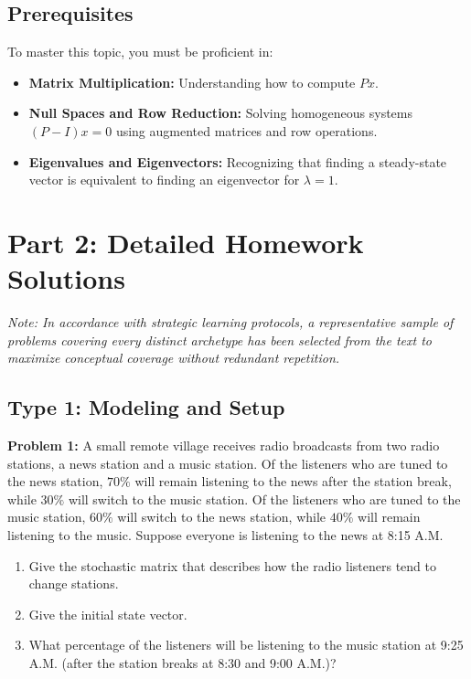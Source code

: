 \documentclass[11pt, letterpaper]{article}
\theoremstyle{definition}
\theoremstyle{remark}
\begin{document}
\subsection{Prerequisites}
To master this topic, you must be proficient in:
\begin{itemize}
    \item \textbf{Matrix Multiplication:} Understanding how to compute $Px$.
    \item \textbf{Null Spaces and Row Reduction:} Solving homogeneous systems $(P - I)x = 0$ using augmented matrices and row operations.
    \item \textbf{Eigenvalues and Eigenvectors:} Recognizing that finding a steady-state vector is equivalent to finding an eigenvector for $\lambda = 1$.
\end{itemize}

\newpage
\section{Part 2: Detailed Homework Solutions}
\textit{Note: In accordance with strategic learning protocols, a representative sample of problems covering every distinct archetype has been selected from the text to maximize conceptual coverage without redundant repetition.}

\subsection{Type 1: Modeling and Setup}

\textbf{Problem 1:} A small remote village receives radio broadcasts from two radio stations, a news station and a music station. Of the listeners who are tuned to the news station, $70\%$ will remain listening to the news after the station break, while $30\%$ will switch to the music station. Of the listeners who are tuned to the music station, $60\%$ will switch to the news station, while $40\%$ will remain listening to the music. Suppose everyone is listening to the news at 8:15 A.M.
\begin{enumerate}[label=\alph*.]
    \item Give the stochastic matrix that describes how the radio listeners tend to change stations.
    \item Give the initial state vector.
    \item What percentage of the listeners will be listening to the music station at 9:25 A.M. (after the station breaks at 8:30 and 9:00 A.M.)?
\end{enumerate}
\end{document}
